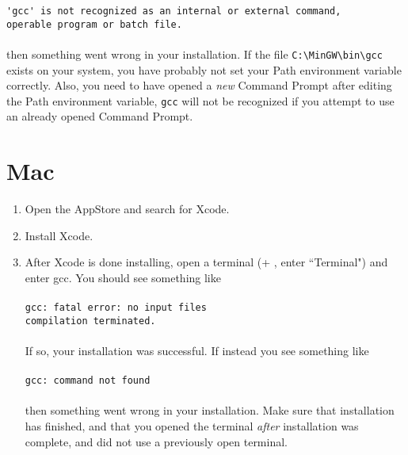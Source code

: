 \documentclass{article}
\begin{document}
\begin{enumerate}
\verb|'gcc' is not recognized as an internal or external command,| \\
\verb|operable program or batch file.| \\ \\
then something went wrong in your installation. If the file \verb|C:\MinGW\bin\gcc| exists on your system,
you have probably not set your Path environment variable correctly. Also, you need to have opened a \textit{new}
Command Prompt after editing the Path environment variable, \verb|gcc| will not be recognized if you attempt to 
use an already opened Command Prompt.
\end{enumerate}

\section*{Mac}
\begin{enumerate}
\item Open the AppStore and search for Xcode.
\item Install Xcode.
\item After Xcode is done installing, open a terminal (\cmdkey + \Spacebar, enter ``Terminal") and enter gcc. 
You should see something like \\ \\
\verb|gcc: fatal error: no input files| \\
\verb|compilation terminated.| \\ \\
If so, your installation was successful. If instead you see something like \\ \\
\verb|gcc: command not found| \\ \\
then something went wrong in your installation. Make sure that installation has finished, and that you opened
the terminal \textit{after} installation was complete, and did not use a previously open terminal.
\end{enumerate}
\end{document}
